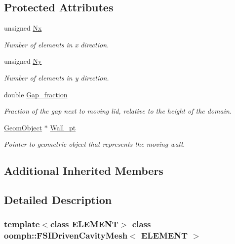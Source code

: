 \subsection*{Protected Attributes}
\begin{DoxyCompactItemize}
\item 
unsigned \hyperlink{classoomph_1_1FSIDrivenCavityMesh_a179f742e7bb521e8943107be3005d49b}{Nx}
\begin{DoxyCompactList}\small\item\em Number of elements in x direction. \end{DoxyCompactList}\item 
unsigned \hyperlink{classoomph_1_1FSIDrivenCavityMesh_af80a5662c2f61ebe49caba4ab08886b9}{Ny}
\begin{DoxyCompactList}\small\item\em Number of elements in y direction. \end{DoxyCompactList}\item 
double \hyperlink{classoomph_1_1FSIDrivenCavityMesh_ad95b3650cfa765b1ac6a0f131d407b23}{Gap\+\_\+fraction}
\begin{DoxyCompactList}\small\item\em Fraction of the gap next to moving lid, relative to the height of the domain. \end{DoxyCompactList}\item 
\hyperlink{classoomph_1_1GeomObject}{Geom\+Object} $\ast$ \hyperlink{classoomph_1_1FSIDrivenCavityMesh_a4f05e03a223ac1f8370bdd39c56a5638}{Wall\+\_\+pt}
\begin{DoxyCompactList}\small\item\em Pointer to geometric object that represents the moving wall. \end{DoxyCompactList}\end{DoxyCompactItemize}
\subsection*{Additional Inherited Members}


\subsection{Detailed Description}
\subsubsection*{template$<$class E\+L\+E\+M\+E\+NT$>$\newline
class oomph\+::\+F\+S\+I\+Driven\+Cavity\+Mesh$<$ E\+L\+E\+M\+E\+N\+T $>$}

